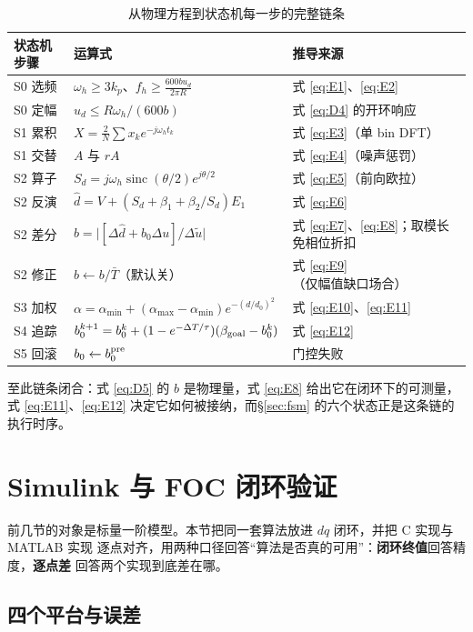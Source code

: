 \documentclass[11pt,a4paper]{ctexart}
\begin{document}
\begin{table}[H]
\centering
\caption{从物理方程到状态机每一步的完整链条}
\label{tab:chain}
\begin{tabular}{lll}
\toprule
状态机步骤 & 运算式 & 推导来源\\
\midrule
S0 选频 & $\omega_h\ge3k_p$、$f_h\ge\frac{600bu_d}{2\pi R}$ & 式 \eqref{eq:E1}、\eqref{eq:E2}\\
S0 定幅 & $u_d\le R\omega_h/(600b)$ & 式 \eqref{eq:D4} 的开环响应\\
S1 累积 & $X=\frac2N\sum x_k e^{-j\omega_h t_k}$ & 式 \eqref{eq:E3}（单 bin DFT）\\
S1 交替 & $A$ 与 $rA$ & 式 \eqref{eq:E4}（噪声惩罚）\\
S2 算子 & $S_d=j\omega_h\operatorname{sinc}(\theta/2)e^{j\theta/2}$ & 式 \eqref{eq:E5}（前向欧拉）\\
S2 反演 & $\hat d=V+(S_d+\beta_1+\beta_2/S_d)E_1$ & 式 \eqref{eq:E6}\\
S2 差分 & $b=\big\lvert[\Delta\hat d+b_0\Delta u]/\Delta\tilde u\big\rvert$ & 式 \eqref{eq:E7}、\eqref{eq:E8}；取模长免相位折扣\\
S2 修正 & $b\leftarrow b/\bar T$（默认关） & 式 \eqref{eq:E9}（仅幅值缺口场合）\\
S3 加权 & $\alpha=\alpha_{\min}+(\alpha_{\max}-\alpha_{\min})e^{-(d/d_0)^2}$ & 式 \eqref{eq:E10}、\eqref{eq:E11}\\
S4 追踪 & $b_0^{k+1}=b_0^k+(1-e^{-\Delta T/\tau})(\beta_{\rm goal}-b_0^k)$ & 式 \eqref{eq:E12}\\
S5 回滚 & $b_0\leftarrow b_0^{\rm pre}$ & 门控失败\\
\bottomrule
\end{tabular}
\end{table}

至此链条闭合：式 \eqref{eq:D5} 的 $b$ 是物理量，式 \eqref{eq:E8} 给出它在闭环下的可测量，
式 \eqref{eq:E11}、\eqref{eq:E12} 决定它如何被接纳，而\S\ref{sec:fsm} 的六个状态正是这条链的执行时序。

\section{Simulink 与 FOC 闭环验证}
\label{sec:sim}

前几节的对象是标量一阶模型。本节把同一套算法放进 $dq$ 闭环，并把 C 实现与 MATLAB 实现
逐点对齐，用两种口径回答“算法是否真的可用”：\textbf{闭环终值}回答精度，\textbf{逐点差}
回答两个实现到底差在哪。

\subsection{四个平台与误差}
\end{document}
